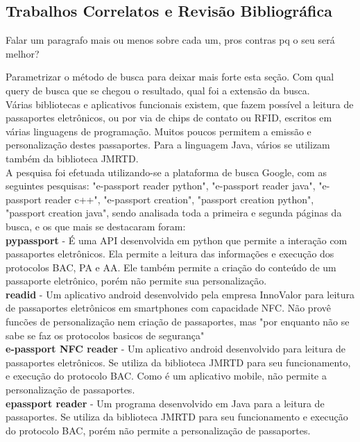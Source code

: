 \documentclass{article}
\begin{document}
	\subsection{Trabalhos Correlatos e Revisão Bibliográfica} Falar um paragrafo mais ou menos sobre cada um, pros contras pq o seu será melhor?
		\begin{justify}
			Parametrizar o método de busca para deixar mais forte esta seção. Com qual query de busca que se chegou o resultado, qual foi a extensão da busca.\\
			\hspace{2cm} Várias bibliotecas e aplicativos funcionais existem, que fazem possível a leitura de passaportes eletrônicos, ou por via de chips de contato ou RFID, escritos em várias linguagens de programação. Muitos poucos permitem a emissão e personalização destes passaportes. Para a linguagem Java, vários se utilizam também da biblioteca JMRTD. \\
			\hspace*{2cm}A pesquisa foi efetuada utilizando-se a plataforma de busca Google, com as seguintes pesquisas: "e-passport reader python", "e-passport reader java", "e-passport reader c++", "e-passport creation", "passport creation python", "passport creation java", sendo analisada toda a primeira e segunda páginas da busca, e os que mais se destacaram foram:\\
			\hspace*{2cm}\textbf{pypassport} - É uma API desenvolvida em python que permite a interação com passaportes eletrônicos. Ela permite a leitura das informações e execução dos protocolos BAC, PA e AA. Ele também permite a criação do conteúdo de um passaporte eletrônico, porém não permite sua personalização.\parencite{PYPASSPORT}\\
			\hspace*{2cm}\textbf{readid} - Um aplicativo android desenvolvido pela empresa InnoValor para leitura de passaportes eletrônicos em smartphones com capacidade NFC. Não provê funcões de personalização nem criação de passaportes, mas "por enquanto não se sabe se faz os protocolos basicos de segurança"\parencite{INNOVALOR}\\
			\hspace*{2cm}\textbf{e-passport NFC reader} - Um aplicativo android desenvolvido para leitura de passaportes eletrônicos. Se utiliza da biblioteca JMRTD para seu funcionamento, e execução do protocolo BAC. Como é um aplicativo mobile, não permite a personalização de passaportes.\parencite{TANANAEV}\\
			\hspace*{2cm}\textbf{epassport reader} - Um programa desenvolvido em Java para a leitura de passaportes. Se utiliza da biblioteca JMRTD para seu funcionamento e execução do protocolo BAC, porém não permite a personalização de passaportes.\parencite{GLAMDRING}\\

		\end{justify}
\end{document}
